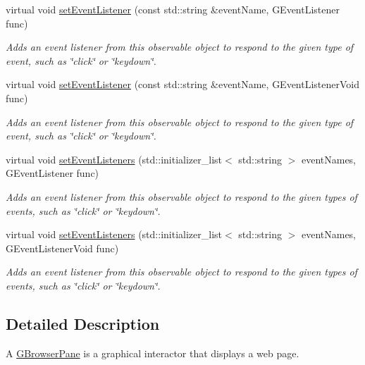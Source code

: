 \begin{DoxyCompactItemize}
virtual void \mbox{\hyperlink{classGObservable_ad2f6d34961c50f6c1e0659990b79f741}{set\+Event\+Listener}} (const std\+::string \&event\+Name, G\+Event\+Listener func)
\begin{DoxyCompactList}\small\item\em Adds an event listener from this observable object to respond to the given type of event, such as \char`\"{}click\char`\"{} or \char`\"{}keydown\char`\"{}. \end{DoxyCompactList}\item 
virtual void \mbox{\hyperlink{classGObservable_abac4cb9f9e626e010e87f5d91573c8a5}{set\+Event\+Listener}} (const std\+::string \&event\+Name, G\+Event\+Listener\+Void func)
\begin{DoxyCompactList}\small\item\em Adds an event listener from this observable object to respond to the given type of event, such as \char`\"{}click\char`\"{} or \char`\"{}keydown\char`\"{}. \end{DoxyCompactList}\item 
virtual void \mbox{\hyperlink{classGObservable_afa388d69c33c718cf035774604065604}{set\+Event\+Listeners}} (std\+::initializer\+\_\+list$<$ std\+::string $>$ event\+Names, G\+Event\+Listener func)
\begin{DoxyCompactList}\small\item\em Adds an event listener from this observable object to respond to the given types of events, such as \char`\"{}click\char`\"{} or \char`\"{}keydown\char`\"{}. \end{DoxyCompactList}\item 
virtual void \mbox{\hyperlink{classGObservable_a7867184bbb686f74fae8a4db927da799}{set\+Event\+Listeners}} (std\+::initializer\+\_\+list$<$ std\+::string $>$ event\+Names, G\+Event\+Listener\+Void func)
\begin{DoxyCompactList}\small\item\em Adds an event listener from this observable object to respond to the given types of events, such as \char`\"{}click\char`\"{} or \char`\"{}keydown\char`\"{}. \end{DoxyCompactList}\end{DoxyCompactItemize}


\subsection{Detailed Description}
A \mbox{\hyperlink{classGBrowserPane}{G\+Browser\+Pane}} is a graphical interactor that displays a web page. 

